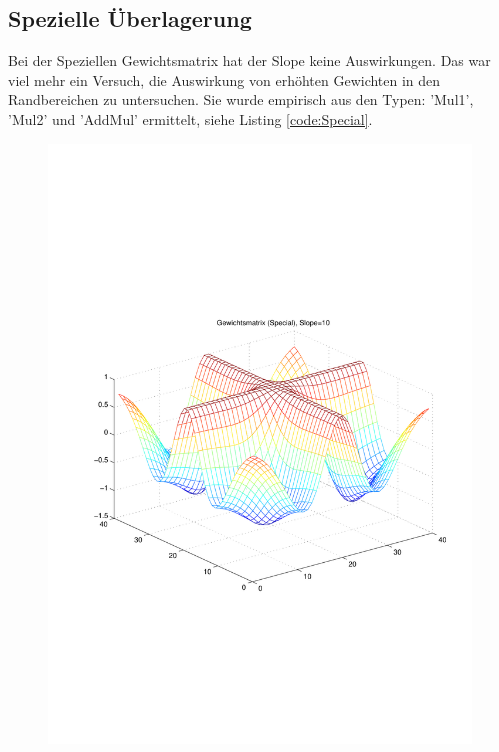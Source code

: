 \subsection{Spezielle Überlagerung}
Bei der Speziellen Gewichtsmatrix hat der Slope keine Auswirkungen. Das war viel mehr ein Versuch, die Auswirkung von erhöhten Gewichten in den Randbereichen zu untersuchen. Sie wurde empirisch aus den Typen: 'Mul1', 'Mul2' und 'AddMul' ermittelt, siehe Listing \ref{code:Special}.

\begin{figure}[hbt]
	\begin{minipage}{0.48\textwidth}
		\includegraphics[trim=70 200 32 242, clip, width=\textwidth]{./Bilder/Auswertung/Gewichtsmatrix/Gewichtsmatrix_Special_Slope_10}

\end{minipage}
\end{figure}
